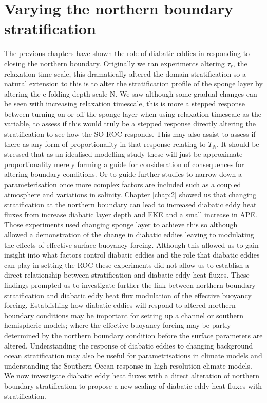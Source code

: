 % 
\chapter[Northern stratification]{Varying the northern boundary stratification}

The previous chapters have shown the role of diabatic eddies in responding to closing the northern boundary. Originally we ran experiments altering $ \tau _r $, the relaxation time scale, this dramatically altered the domain stratification so a natural extension to this is to alter the stratification profile of the sponge layer by altering the e-folding depth scale N. We saw although some gradual changes can be seen with increasing relaxation timescale, this is more a stepped response between turning on or off the sponge layer when using relaxation timescale as the variable, to assess if this would truly be a stepped response  directly altering the stratification to see how the SO ROC responds. This may also assist to assess if there as any form of proportionality in that response relating to $T_N$. It should be stressed that as an idealised modelling study these will just be approximate proportionality merely forming a guide for consideration of consequences for altering boundary conditions. Or to guide further studies to narrow down a parameterisation once more complex factors are included such as a coupled atmosphere and variations in salinity. 
Chapter \ref{chap:2} showed us that changing stratification at the northern boundary can lead to increased diabatic eddy heat fluxes from increase diabatic layer depth and EKE and a small increase in APE. Those experiments used changing sponge layer to achieve this so although allowed a demonstration of the change in diabatic eddies leaving to modulating the effects of effective surface buoyancy forcing. Although this allowed us to gain insight into what factors control diabatic eddies and the role that diabatic eddies can play in setting the ROC these experiments did not allow us to establish a direct relationship between stratification and diabatic eddy heat fluxes. 
These findings prompted us to investigate further the link between northern boundary stratification and diabatic eddy heat flux modulation of the effective buoyancy forcing. Establishing how diabatic eddies will respond to altered northern boundary conditions may be important for setting up a channel or southern hemispheric models; where the effective buoyancy forcing may be partly determined by the northern boundary condition before the surface parameters are altered. Understanding the response of diabatic eddies to changing background ocean stratification may also be useful for parametrisations in climate models and understanding the Southern Ocean response in high-resolution climate models. We now investigate diabatic eddy heat fluxes with a direct alteration of northern boundary stratification to propose a new scaling of diabatic eddy heat fluxes with stratification.


